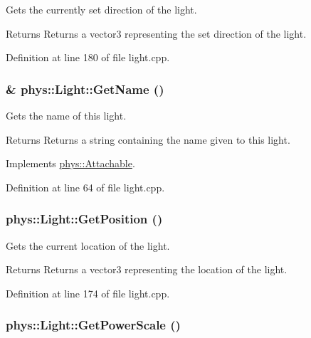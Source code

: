 Gets the currently set direction of the light. 

\begin{DoxyReturn}{Returns}
Returns a vector3 representing the set direction of the light. 
\end{DoxyReturn}


Definition at line 180 of file light.cpp.

\hypertarget{classphys_1_1Light_a8e81734d570edd31b0a7ae6b1b3a194e}{
\subsubsection[{GetName}]{ \& phys::Light::GetName ()}}
\label{dc/df1/classphys_1_1Light_a8e81734d570edd31b0a7ae6b1b3a194e}


Gets the name of this light. 

\begin{DoxyReturn}{Returns}
Returns a string containing the name given to this light. 
\end{DoxyReturn}


Implements \hyperlink{classphys_1_1Attachable_ad1a9bbd300fe21c5cc7e5aa7e2c95b85}{phys::Attachable}.



Definition at line 64 of file light.cpp.

\hypertarget{classphys_1_1Light_ae2211ed844f8f5e25bcb74c3222a87d1}{
\subsubsection[{GetPosition}]{ phys::Light::GetPosition ()}}
\label{dc/df1/classphys_1_1Light_ae2211ed844f8f5e25bcb74c3222a87d1}


Gets the current location of the light. 

\begin{DoxyReturn}{Returns}
Returns a vector3 representing the location of the light. 
\end{DoxyReturn}


Definition at line 174 of file light.cpp.

\hypertarget{classphys_1_1Light_a686dece4d19fbf37705e47e605f7fabf}{
\subsubsection[{GetPowerScale}]{ phys::Light::GetPowerScale ()}}
\label{dc/df1/classphys_1_1Light_a686dece4d19fbf37705e47e605f7fabf}


